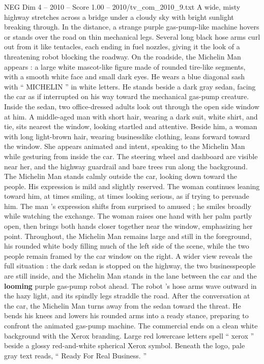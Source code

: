 \begin{textsample}{NEG Dim 4 – 2010 – Score 1.00 – 2010/tv\_com\_2010\_9.txt}  \label{ex:f4_neg_076}
A wide, misty highway stretches across a bridge under a cloudy sky with bright sunlight breaking through.
In the distance, a strange purple gas-pump-like machine hovers or stands over the road on thin mechanical legs.
Several long black hose arms curl out from it like tentacles, each ending in fuel nozzles, giving it the look of a threatening robot blocking the roadway.
On the roadside, the Michelin Man appears : a large white mascot-like figure made of rounded tire-like segments, with a smooth white face and small dark eyes.
He wears a blue diagonal sash with “ MICHELIN ” in white letters.
He stands beside a dark gray sedan, facing the car as if interrupted on his way toward the mechanical gas-pump creature.
Inside the sedan, two office-dressed adults look out through the open side window at him.
A middle-aged man with short hair, wearing a dark suit, white shirt, and tie, sits nearest the window, looking startled and attentive.
Beside him, a woman with long light-brown hair, wearing businesslike clothing, leans forward toward the window.
She appears animated and intent, speaking to the Michelin Man while gesturing from inside the car.
The steering wheel and dashboard are visible near her, and the highway guardrail and bare trees run along the background.
The Michelin Man stands calmly outside the car, looking down toward the people.
His expression is mild and slightly reserved.
The woman continues leaning toward him, at times smiling, at times looking serious, as if trying to persuade him.
The man ’s expression shifts from surprised to amused ; he smiles broadly while watching the exchange.
The woman raises one hand with her palm partly open, then brings both hands closer together near the window, emphasizing her point.
Throughout, the Michelin Man remains large and still in the foreground, his rounded white body filling much of the left side of the scene, while the two people remain framed by the car window on the right.
A wider view reveals the full situation : the dark sedan is stopped on the highway, the two businesspeople are still inside, and the Michelin Man stands in the lane between the car and the \textbf{looming} purple gas-pump robot ahead.
The robot ’s hose arms wave outward in the hazy light, and its spindly legs straddle the road.
After the conversation at the car, the Michelin Man turns away from the sedan toward the threat.
He bends his knees and lowers his rounded arms into a ready stance, preparing to confront the animated gas-pump machine.
The commercial ends on a clean white background with the Xerox branding.
Large red lowercase letters spell “ xerox ” beside a glossy red-and-white spherical Xerox symbol.
Beneath the logo, pale gray text reads, “ Ready For Real Business. ”

\end{textsample}
